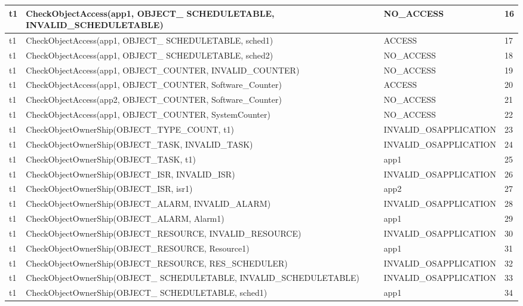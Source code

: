 \documentclass[10pt]{article}
\newlength{\Li}\settowidth{\Li}{Running}
\newlength{\Lii}\setlength{\Lii}{7cm}
\newlength{\Liiii}\setlength{\Liiii}{0.9cm}
\newlength{\Liii}\setlength{\Liii}{\textwidth} \addtolength{\Liii}{-\Li} \addtolength{\Liii}{-\Lii} \addtolength{\Liii}{-\Liiii}
\begin{document}
\begin{supertabular}{|p{\Li}|p{\Lii}|p{\Liii}|p{\Liiii}|}
	t1		& CheckObjectAccess(app1, OBJECT\_ SCHEDULETABLE, INVALID\_SCHEDULETABLE)	& NO\_ACCESS				& 16 \\ \hline
	t1		& CheckObjectAccess(app1, OBJECT\_ SCHEDULETABLE, sched1)				& ACCESS						& 17 \\ \hline
	t1		& CheckObjectAccess(app1, OBJECT\_ SCHEDULETABLE, sched2)				& NO\_ACCESS					& 18 \\ \hline
	
	t1		& CheckObjectAccess(app1, OBJECT\_COUNTER, INVALID\_COUNTER)			& NO\_ACCESS					& 19 \\ \hline
	t1		& CheckObjectAccess(app1, OBJECT\_COUNTER, Software\_Counter)				& ACCESS						& 20 \\ \hline
	t1		& CheckObjectAccess(app2, OBJECT\_COUNTER, Software\_Counter)				& NO\_ACCESS					& 21 \\ \hline
	t1		& CheckObjectAccess(app1, OBJECT\_COUNTER, SystemCounter)				& NO\_ACCESS					& 22 \\ \hline
	
	t1		& CheckObjectOwnerShip(OBJECT\_TYPE\_COUNT, t1)							& INVALID\_OSAPPLICATION			& 23 \\ \hline
	t1		& CheckObjectOwnerShip(OBJECT\_TASK, INVALID\_TASK)						& INVALID\_OSAPPLICATION			& 24 \\ \hline
	t1		& CheckObjectOwnerShip(OBJECT\_TASK, t1)								& app1							& 25 \\ \hline
	
	t1		& CheckObjectOwnerShip(OBJECT\_ISR, INVALID\_ISR)						& INVALID\_OSAPPLICATION			& 26 \\ \hline
	t1		& CheckObjectOwnerShip(OBJECT\_ISR, isr1)								& app2							& 27 \\ \hline
	
	t1		& CheckObjectOwnerShip(OBJECT\_ALARM, INVALID\_ALARM)					& INVALID\_OSAPPLICATION			& 28 \\ \hline
	t1		& CheckObjectOwnerShip(OBJECT\_ALARM, Alarm1)							& app1							& 29 \\ \hline
	
	t1		& CheckObjectOwnerShip(OBJECT\_RESOURCE, INVALID\_RESOURCE)			& INVALID\_OSAPPLICATION			& 30 \\ \hline
	t1		& CheckObjectOwnerShip(OBJECT\_RESOURCE, Resource1)					& app1							& 31 \\ \hline
	t1		& CheckObjectOwnerShip(OBJECT\_RESOURCE, RES\_SCHEDULER)			& INVALID\_OSAPPLICATION			& 32 \\ \hline
	
	t1		& CheckObjectOwnerShip(OBJECT\_ SCHEDULETABLE, INVALID\_SCHEDULETABLE)	& INVALID\_OSAPPLICATION			& 33 \\ \hline
	t1		& CheckObjectOwnerShip(OBJECT\_ SCHEDULETABLE, sched1)					& app1							& 34 \\ \hline
	

\end{supertabular}
\end{document}
